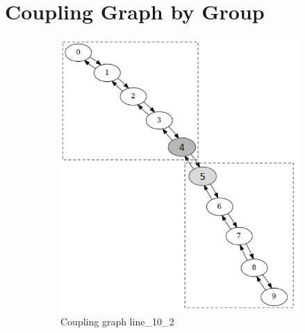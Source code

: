 \chapter{Coupling Graph by Group} \label{app:coupling-graph-by-group}
\begin{figure}[!htb]
    \begin{subfigure}{0.4\linewidth}
        \includegraphics[width=\linewidth]{image/coupling_graph_line.png}
        \caption{Coupling graph line\_10\_2}
        \label{fig:coupling-graph-line}
    \end{subfigure}
    \hfill
    \begin{subfigure}{0.25\linewidth}

\end{subfigure}
\end{figure}
